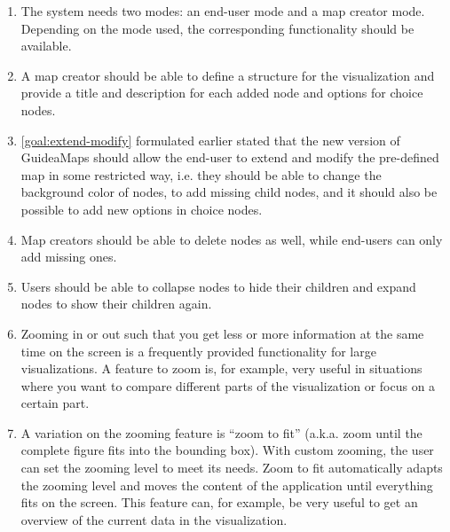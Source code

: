 \begin{enumerate}[label=\textbf{FR \arabic*}., labelindent=0.5cm, ref=FR \arabic*, leftmargin=*]

	\item \label{fr:modes-rights}
		The system needs two modes: an end-user mode and a map creator mode. Depending on the mode used, the corresponding functionality should be available. 
	
	\item \label{fr:mapcreator:template}
		A map creator should be able to define a structure for the visualization and provide a title and description for each added node and options for choice nodes.
		
	\item \label{fr:customization} 
		\ref{goal:extend-modify} formulated earlier stated that the new version of GuideaMaps should allow the end-user to extend and modify the pre-defined map in some restricted way, i.e. they should be able to change the background color of nodes, to add missing child nodes, and it should also be possible to add new options in choice nodes. 
	
	\item \label{fr:delete-nodes}
		Map creators should be able to delete nodes as well, while end-users can only add missing ones.
		
	\item \label{fr:expand-collapse}
		Users should be able to collapse nodes to hide their children and expand nodes to show their children again.
  
	\item \label{fr:zoom}
		Zooming in or out such that you get less or more information at the same time on the screen is a frequently provided functionality for large visualizations. A feature to zoom is, for example, very useful in situations where you want to compare different parts of the visualization or focus on a certain part.
	
	\item \label{fr:zoom-to-fit}
		A variation on the zooming feature is ``zoom to fit'' (a.k.a. zoom until the complete figure fits into the bounding box). With custom zooming, the user can set the zooming level to meet its needs. Zoom to fit automatically adapts the zooming level and moves the content of the application until everything fits on the screen. This feature can, for example, be very useful to get an overview of the current data in the visualization.
		

\end{enumerate}
